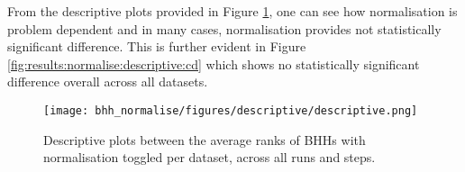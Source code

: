 \begin{table}[htbp]
      \centering
      \caption{Post Hoc Comparisons - BHH Variant: Normalise}
      \label{tab:results:normalise:post_hoc}%
      \par\bigskip
\end{table}

From the descriptive plots provided in Figure \ref{fig:results:normalise:descriptive:descriptive}, one can see how normalisation is problem dependent and in many cases, normalisation provides not statistically significant difference. This is further evident in Figure \ref{fig:results:normalise:descriptive:cd} which shows no statistically significant difference overall across all datasets.

\begin{figure}[htbp]
      \centering
      \texttt{[image: bhh\_normalise/figures/descriptive/descriptive.png]}
      \caption{Descriptive plots between the average ranks of \Acsp{BHH} with normalisation toggled per dataset, across all runs and steps.}
      \label{fig:results:normalise:descriptive:descriptive}
\end{figure}

